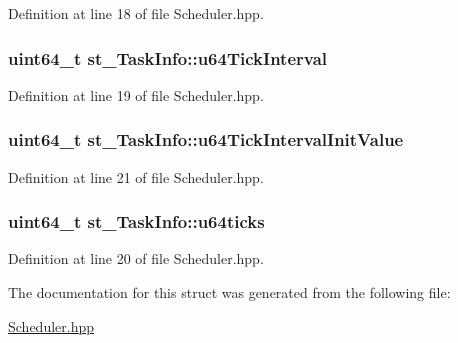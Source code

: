 Definition at line 18 of file Scheduler.\+hpp.

\subsubsection[{\texorpdfstring{u64\+Tick\+Interval}{u64TickInterval}}]{\setlength{\rightskip}{0pt plus 5cm}uint64\+\_\+t st\+\_\+\+Task\+Info\+::u64\+Tick\+Interval}\hypertarget{structst___task_info_abad0b9332ad4c9643b52f6072ab87e60}{}\label{structst___task_info_abad0b9332ad4c9643b52f6072ab87e60}


Definition at line 19 of file Scheduler.\+hpp.

\subsubsection[{\texorpdfstring{u64\+Tick\+Interval\+Init\+Value}{u64TickIntervalInitValue}}]{\setlength{\rightskip}{0pt plus 5cm}uint64\+\_\+t st\+\_\+\+Task\+Info\+::u64\+Tick\+Interval\+Init\+Value}\hypertarget{structst___task_info_a88e71c1b02161db554520e4ee2f5225f}{}\label{structst___task_info_a88e71c1b02161db554520e4ee2f5225f}


Definition at line 21 of file Scheduler.\+hpp.

\subsubsection[{\texorpdfstring{u64ticks}{u64ticks}}]{\setlength{\rightskip}{0pt plus 5cm}uint64\+\_\+t st\+\_\+\+Task\+Info\+::u64ticks}\hypertarget{structst___task_info_a54d576785977f03f224b4e2060f8c8f4}{}\label{structst___task_info_a54d576785977f03f224b4e2060f8c8f4}


Definition at line 20 of file Scheduler.\+hpp.



The documentation for this struct was generated from the following file\+:\begin{DoxyCompactItemize}
\item 
\hyperlink{_scheduler_8hpp}{Scheduler.\+hpp}\end{DoxyCompactItemize}
